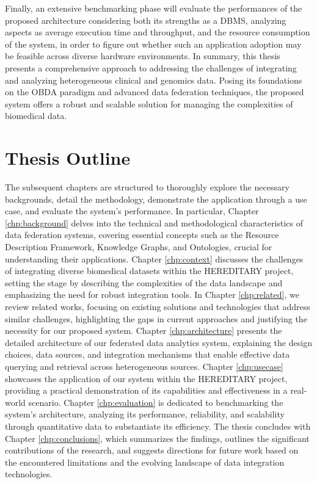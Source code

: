 Finally, an extensive benchmarking phase will evaluate the performances of the proposed architecture considering both its strengths as a \ac{DBMS}, analyzing aspects as average execution time and throughput, and the resource consumption of the system, in order to figure out whether such an application adoption may be feasible across diverse hardware environments.
In summary, this thesis presents a comprehensive approach to addressing the challenges of integrating and analyzing heterogeneous clinical and genomics data. Posing its foundations on the \ac{OBDA} paradigm and advanced data federation techniques, the proposed system offers a robust and scalable solution for managing the complexities of biomedical data.
\section{Thesis Outline}
The subsequent chapters are structured to thoroughly explore the necessary backgrounds, detail the methodology, demonstrate the application through a use case, and evaluate the system's performance.
In particular, Chapter \ref{chp:background} delves into the technical and methodological characteristics of data federation systems, covering essential concepts such as the Resource Description Framework, Knowledge Graphs, and Ontologies, crucial for understanding their applications. Chapter \ref{chp:context} discusses the challenges of integrating diverse biomedical datasets within the \ac{HEREDITARY} project, setting the stage by describing the complexities of the data landscape and emphasizing the need for robust integration tools.
In Chapter \ref{chp:related}, we review related works, focusing on existing solutions and technologies that address similar challenges, highlighting the gaps in current approaches and justifying the necessity for our proposed system. Chapter \ref{chp:architecture} presents the detailed architecture of our federated data analytics system, explaining the design choices, data sources, and integration mechanisms that enable effective data querying and retrieval across heterogeneous sources.
Chapter \ref{chp:usecase} showcases the application of our system within the \ac{HEREDITARY} project, providing a practical demonstration of its capabilities and effectiveness in a real-world scenario. Chapter \ref{chp:evaluation} is dedicated to benchmarking the system's architecture, analyzing its performance, reliability, and scalability through quantitative data to substantiate its efficiency.
The thesis concludes with Chapter \ref{chp:conclusions}, which summarizes the findings, outlines the significant contributions of the research, and suggests directions for future work based on the encountered limitations and the evolving landscape of data integration technologies.